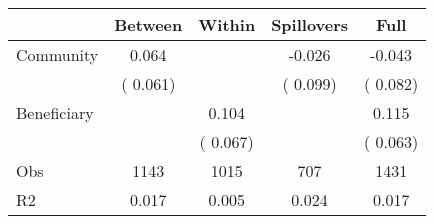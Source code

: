 
\begin{tabular}{l*{4}{c}}\hline&\multicolumn{1}{c}{Between}&\multicolumn{1}{c}{Within}&\multicolumn{1}{c}{Spillovers}&\multicolumn{1}{c}{Full}\\ \hline
 Community             &              0.064      &                                               &       -0.026 &        -0.043                            \\ 
                               &        (       0.061)           &                                       &       (       0.099)     &      (       0.082)                                           \\ 
 Beneficiary   &                                               &        0.104    &                                &             0.115                            \\ 
                               &                                               & (       0.067)                  &                                        &      (       0.063)                                           \\ 
\hline                                                                                                                                                                                                                                            
 Obs                   &               1143               &       1015                       &       707                &              1431                                               \\ 
 R2                    &                      0.017              &              0.005                      &              0.024               &                     0.017                                              \\ 
\hline \end{tabular}                                                                                                                                                                                                              